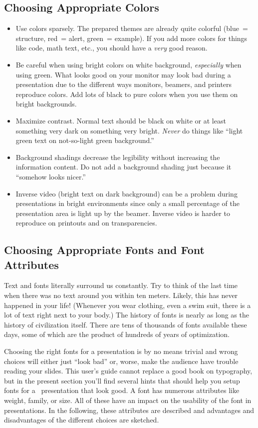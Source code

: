 \subsection{Choosing Appropriate Colors}

\begin{itemize}
\item
  Use colors sparsely. The prepared themes are already quite colorful (blue~= structure, red~= alert, green~= example). If you add more colors for things like code, math text, etc., you should have a \emph{very} good reason.
\item
  Be careful when using bright colors on white background, \emph{especially} when using green. What looks good on your monitor may look bad during a presentation due to the different ways monitors, beamers, and printers reproduce colors. Add lots of black to pure colors when you use them on bright backgrounds.
\item
  Maximize contrast. Normal text should be black on white or at least something very dark on something very bright. \emph{Never} do things like ``light green text on not-so-light green background.''
\item
  Background shadings decrease the legibility without increasing the information content. Do not add a background shading just because it ``somehow looks nicer.''
\item
  Inverse video (bright text on dark background) can be a problem during presentations in bright environments since only a small percentage of the presentation area is light up by the beamer. Inverse video is harder to reproduce on printouts and on transparencies.
\end{itemize}


\subsection{Choosing Appropriate Fonts and Font Attributes}

Text and fonts literally surround us constantly. Try to think of the last time when there was no text around you within ten meters. Likely, this has never happened in your life! (Whenever you wear clothing, even a swim suit, there is a lot of text right next to your body.) The history of fonts is nearly as long as the history of civilization itself. There are tens of thousands of fonts available these days, some of which are the product of hundreds of years of optimization.

Choosing the right fonts for a presentation is by no means trivial and wrong choices will either just ``look bad'' or, worse, make the audience have trouble reading your slides. This user's guide cannot replace a good book on typography, but in the present section you'll find several hints that should help you setup fonts for a \beamer\ presentation that look good. A font has numerous attributes like weight, family, or size. All of these have an impact on the usability of the font in presentations. In the following, these attributes are described and advantages and disadvantages of the different choices are sketched.

